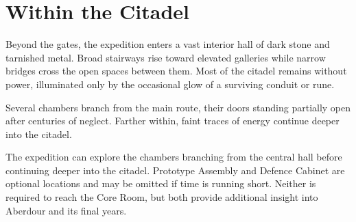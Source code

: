 \section*{Within the Citadel}
\begin{DndReadAloud}
	Beyond the gates, the expedition enters a vast interior hall of dark stone and tarnished metal. Broad stairways rise toward elevated galleries while narrow bridges cross the open spaces between them. Most of the citadel remains without power, illuminated only by the occasional glow of a surviving conduit or rune.

	Several chambers branch from the main route, their doors standing partially open after centuries of neglect. Farther within, faint traces of energy continue deeper into the citadel.
\end{DndReadAloud}
{\noindent\entryfont The expedition can explore the chambers branching from the central hall before continuing deeper into the citadel. Prototype Assembly and Defence Cabinet are optional locations and may be omitted if time is running short. Neither is required to reach the Core Room, but both provide additional insight into Aberdour and its final years.}
